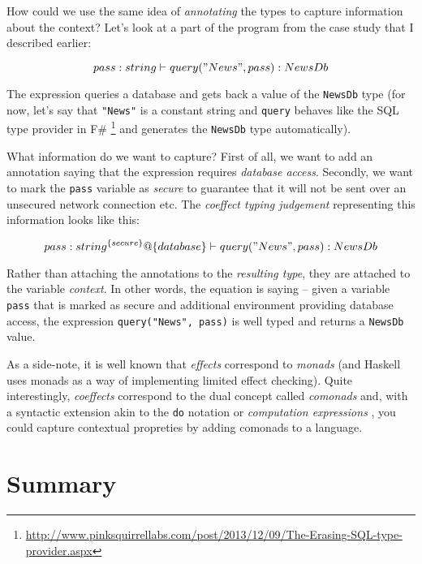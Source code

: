 How could we use the same idea of \emph{annotating} the types to capture information about the context?
Let's look at a part of the program from the case study that I described earlier:

\begin{equation}
pass : string \vdash query("News", pass) : NewsDb
\end{equation}

The expression queries a database and gets back a value of the \texttt{NewsDb} type (for now, let's say
that \texttt{"News"} is a constant string and \texttt{query} behaves like the SQL type provider in F\# \footnote{\url{http://www.pinksquirrellabs.com/post/2013/12/09/The-Erasing-SQL-type-provider.aspx}}
and generates the \texttt{NewsDb} type automatically).

What information do we want to capture? First of all, we want to add an annotation saying that
the expression requires \emph{database access}. Secondly, we want to mark the \texttt{pass} variable as 
\emph{secure} to guarantee that it will not be sent over an unsecured network connection etc.
The \emph{coeffect typing judgement} representing this information looks like this:

\begin{equation}
pass : string^{\{secure\}} @ \{database\} \vdash query("News", pass) : NewsDb
\end{equation}

Rather than attaching the annotations to the \emph{resulting type}, they are attached to the 
variable \emph{context}. In other words, the equation is saying -- given a variable \texttt{pass} that is
marked as secure and additional environment providing database access, the expression
\texttt{query("News", pass)} is well typed and returns a \texttt{NewsDb} value.

As a side-note, it is well known that \emph{effects} correspond to \emph{monads} (and Haskell uses
monads as a way of implementing limited effect checking). Quite interestingly, \emph{coeffects}
correspond to the dual concept called \emph{comonads} and, with a syntactic extension akin to 
the \texttt{do} notation or \emph{computation expressions} \cite{xx}, you could capture contextual 
propreties by adding comonads to a language.


\section{Summary}

